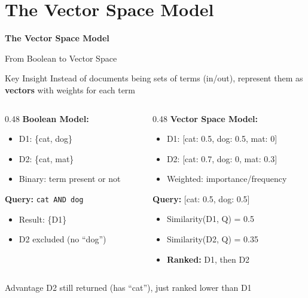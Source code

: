 \documentclass[aspectratio=169]{beamer}
\newif\ifanimated
\newcommand{\cpause}{\ifanimated\pause\fi}
\begin{document}
\section{The Vector Space Model}
\begin{frame}
  \centering
  \LARGE \textbf{The Vector Space Model}
\end{frame}


\begin{frame}[shrink=10]{From Boolean to Vector Space}
\begin{block}{Key Insight}
Instead of documents being sets of terms (in/out), represent them as \textbf{vectors} with weights for each term
\end{block}
\cpause
\vspace{1em}

\begin{columns}
\begin{column}{0.48\textwidth}
\textbf{Boolean Model:}
\begin{itemize}
    \item D1: \{cat, dog\}
    \item D2: \{cat, mat\}
    \item Binary: term present or not
\end{itemize}
\cpause
\vspace{1em}

\textbf{Query:} \texttt{cat AND dog}
\begin{itemize}
    \item Result: \{D1\}
    \item D2 excluded (no ``dog'')
\end{itemize}
\cpause
\end{column}

\begin{column}{0.48\textwidth}
\textbf{Vector Space Model:}
\begin{itemize}
    \item D1: [cat: 0.5, dog: 0.5, mat: 0]
    \item D2: [cat: 0.7, dog: 0, mat: 0.3]
    \item Weighted: importance/frequency
\end{itemize}
\cpause
\vspace{1em}

\textbf{Query:} [cat: 0.5, dog: 0.5]
\begin{itemize}
    \item Similarity(D1, Q) = 0.5
    \item Similarity(D2, Q) = 0.35
    \item \textbf{Ranked:} D1, then D2
\end{itemize}
\cpause
\end{column}
\end{columns}

\vspace{1em}

\begin{exampleblock}{Advantage}
D2 still returned (has ``cat''), just ranked lower than D1
\end{exampleblock}
\end{frame}
\end{document}
